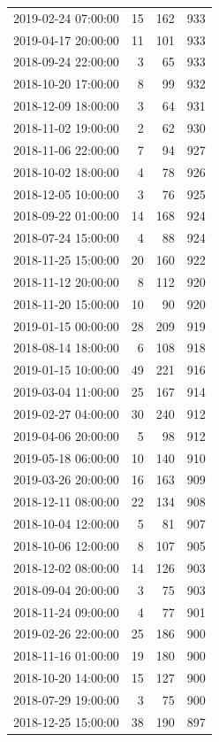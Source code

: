 \begin{tabular}{lrrr}
2019-02-24 07:00:00 & 15 & 162 & 933 \\
2019-04-17 20:00:00 & 11 & 101 & 933 \\
2018-09-24 22:00:00 & 3 & 65 & 933 \\
2018-10-20 17:00:00 & 8 & 99 & 932 \\
2018-12-09 18:00:00 & 3 & 64 & 931 \\
2018-11-02 19:00:00 & 2 & 62 & 930 \\
2018-11-06 22:00:00 & 7 & 94 & 927 \\
2018-10-02 18:00:00 & 4 & 78 & 926 \\
2018-12-05 10:00:00 & 3 & 76 & 925 \\
2018-09-22 01:00:00 & 14 & 168 & 924 \\
2018-07-24 15:00:00 & 4 & 88 & 924 \\
2018-11-25 15:00:00 & 20 & 160 & 922 \\
2018-11-12 20:00:00 & 8 & 112 & 920 \\
2018-11-20 15:00:00 & 10 & 90 & 920 \\
2019-01-15 00:00:00 & 28 & 209 & 919 \\
2018-08-14 18:00:00 & 6 & 108 & 918 \\
2019-01-15 10:00:00 & 49 & 221 & 916 \\
2019-03-04 11:00:00 & 25 & 167 & 914 \\
2019-02-27 04:00:00 & 30 & 240 & 912 \\
2019-04-06 20:00:00 & 5 & 98 & 912 \\
2019-05-18 06:00:00 & 10 & 140 & 910 \\
2019-03-26 20:00:00 & 16 & 163 & 909 \\
2018-12-11 08:00:00 & 22 & 134 & 908 \\
2018-10-04 12:00:00 & 5 & 81 & 907 \\
2018-10-06 12:00:00 & 8 & 107 & 905 \\
2018-12-02 08:00:00 & 14 & 126 & 903 \\
2018-09-04 20:00:00 & 3 & 75 & 903 \\
2018-11-24 09:00:00 & 4 & 77 & 901 \\
2019-02-26 22:00:00 & 25 & 186 & 900 \\
2018-11-16 01:00:00 & 19 & 180 & 900 \\
2018-10-20 14:00:00 & 15 & 127 & 900 \\
2018-07-29 19:00:00 & 3 & 75 & 900 \\
2018-12-25 15:00:00 & 38 & 190 & 897 \\

\end{tabular}
